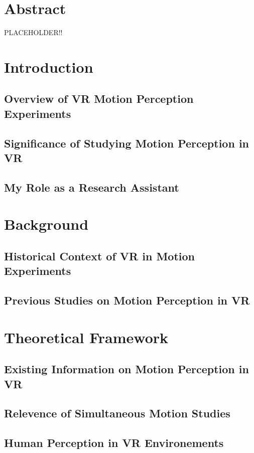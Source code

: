 \documentclass[a4paper, 11pt, oneside]{book}
\begin{document}
    \setlength{\parskip}{2ex}
    \tableofcontents
    \clearpage

    \chapter{Abstract}
        PLACEHOLDER!!

    \chapter{Introduction}
        \section{Overview of VR Motion Perception Experiments}
        \section{Significance of Studying Motion Perception in VR}
        \section{My Role as a Research Assistant}
    
    \chapter{Background}
        \section{Historical Context of VR in Motion Experiments}
        \section{Previous Studies on Motion Perception in VR}
    
    \chapter{Theoretical Framework}
        \section{Existing Information on Motion Perception in VR}
        \section{Relevence of Simultaneous Motion Studies}
        \section{Human Perception in VR Environements}
\end{document}
